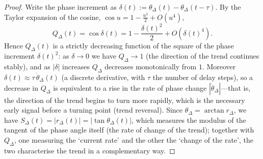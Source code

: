 \begin{proof}
Write the phase increment as $\delta(t) := \theta_\Delta(t) - \theta_\Delta(t-\tau)$. By the Taylor expansion of the cosine, $\cos u = 1 - \frac{u^2}{2} + O(u^4)$,
\[
Q_\Delta(t) = \cos \delta(t) = 1 - \frac{\delta(t)^2}{2} + O(\delta(t)^4).
\]
Hence $Q_\Delta(t)$ is a strictly decreasing function of the square of the phase increment $\delta(t)^2$: as $\delta \to 0$ we have $Q_\Delta \to 1$ (the direction of the trend continues stably), and as $|\delta|$ increases $Q_\Delta$ decreases monotonically from $1$. Moreover $\delta(t) \approx \tau\, \dot{\theta}_\Delta(t)$ (a discrete derivative, with $\tau$ the number of delay steps), so a decrease in $Q_\Delta$ is equivalent to a rise in the rate of phase change $|\dot{\theta}_\Delta|$---that is, the direction of the trend begins to turn more rapidly, which is the necessary early signal before a turning point (trend reversal). Since $\theta_\Delta = \arctan r_\Delta$, we have $S_\Delta(t) = |r_\Delta(t)| = |\tan \theta_\Delta(t)|$, which measures the modulus of the tangent of the phase angle itself (the rate of change of the trend); together with $Q_\Delta$, one measuring the `current rate' and the other the `change of the rate', the two characterise the trend in a complementary way.
\end{proof}


